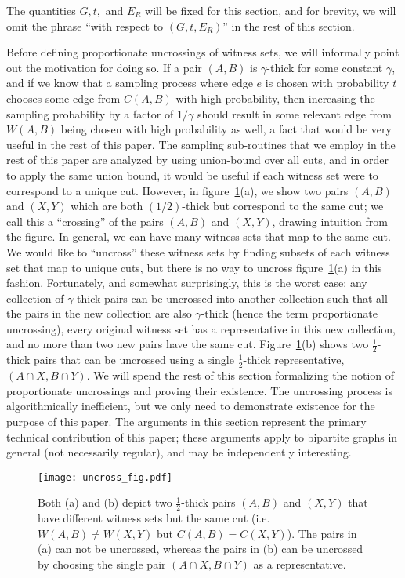 \documentclass[11pt]{article}
\begin{document}
The quantities $G,t,$ and $E_R$ will be fixed for this section, and
for brevity, we will omit the phrase ``with respect to $(G,t,E_R)$'' in the
rest of this section.

Before defining proportionate uncrossings of witness sets, we will informally
point out the motivation for doing so. If a pair $(A,B)$ is $\gamma$-thick for
some constant $\gamma$, and if we know that a sampling process where edge $e$
is chosen with probability $t$ chooses some edge from $C(A,B)$ with high
probability, then increasing the sampling probability by a factor of
$1/\gamma$ should result in some relevant edge from $W(A,B)$ being chosen with
high probability as well, a fact that would be very useful in the rest of this
paper. The sampling sub-routines that we employ in the rest of this paper are
analyzed by using union-bound over all cuts, and in order to apply the same
union bound, it would be useful if each witness set were to correspond to a
unique cut. However, in figure~\ref{fig:cross}(a), we show two pairs $(A,B)$
and $(X,Y)$ which are both $(1/2)$-thick but correspond to the same cut; we
call this a ``crossing'' of the pairs $(A,B)$ and $(X,Y)$, drawing intuition
from the figure. In general, we can have many witness sets that map to the
same cut. We would like to ``uncross'' these witness sets by finding subsets
of each witness set that map to unique cuts, but there is no way to uncross
figure~\ref{fig:cross}(a) in this fashion. Fortunately, and somewhat
surprisingly, this is the worst case: any collection of $\gamma$-thick pairs
can be uncrossed into another collection such that all the pairs in the new
collection are also $\gamma$-thick (hence the term proportionate uncrossing),
every original witness set has a representative in this new collection, and no
more than two new pairs have the same cut. Figure~\ref{fig:cross}(b) shows two
$\frac{1}{2}$-thick pairs that can be uncrossed using a single $\frac{1}{2}$-thick
representative, $(A\cap X, B\cap Y)$. We will spend the rest of this section
formalizing the notion of proportionate uncrossings and proving their
existence. The uncrossing process is algorithmically inefficient, but we only
need to demonstrate existence for the purpose of this paper. The arguments in
this section represent the primary technical contribution of this paper; these
arguments apply to bipartite graphs in general (not necessarily regular), and
may be independently interesting. \vspace{-0.1in}
\begin{figure}[htbp]
  \centering
  \texttt{[image: uncross\_fig.pdf]}
  \vspace{-0.15in}
  \caption{ Both (a) and (b) depict two $\frac{1}{2}$-thick pairs $(A,B)$ and
    $(X,Y)$ that have different witness sets but the same cut (i.e. $W(A,B) \neq W(X,Y)$ but $C(A,B) = C(X,Y)$). The pairs in
    (a) can not be uncrossed, whereas the pairs in (b) can be uncrossed by
    choosing the single pair $(A\cap X, B\cap Y)$ as a representative.}
\label{fig:cross}
\end{figure}
\end{document}
